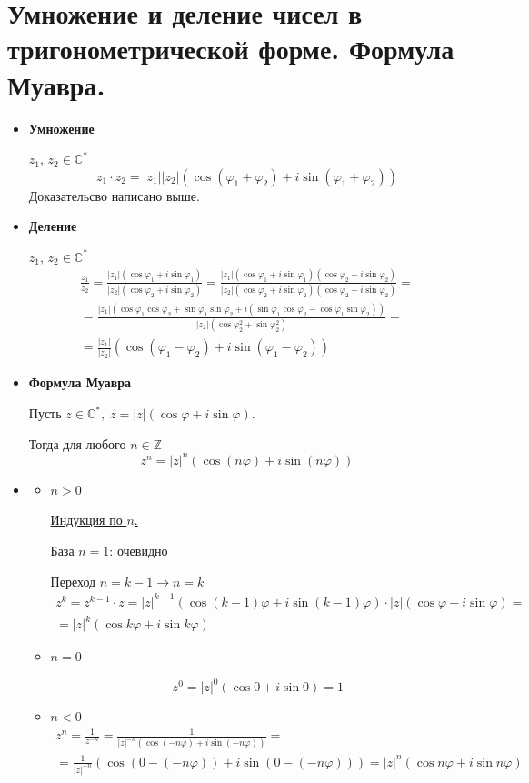 \documentclass[12pt,letterpaper]{report}
\makeatletter
\theoremstyle{definition}
\renewenvironment{proof}[1][\proofname]{%
   \par\pushQED{\qed}\normalfont%
   \topsep6\p@\@plus6\p@\relax
   \trivlist\item[\hskip\labelsep\bfseries#1\@addpunct{.}]%
   \ignorespaces
}{%
   \popQED\endtrivlist\@endpefalse
}
\makeatother
\begin{document}
\section{Умножение и деление чисел в тригонометрической форме. Формула Муавра.}
\begin{itemize}
  \item \textbf{Умножение} 
  
  $z_1,\, z_2 \in \mathbb{C}^*$
  \[ z_1 \cdot z_2 = |z_1||z_2|(\cos(\varphi_1 + \varphi_2) + i\sin(\varphi_1 + \varphi_2)) \]
  Доказательсво написано выше.
  \item \textbf{Деление} 

  $z_1,\, z_2 \in \mathbb{C}^*$
  \begin{gather*}
    \frac{z_1}{z_2} = \frac{|z_1|(\cos\varphi_1 + i\sin\varphi_1)}{|z_2|(\cos\varphi_2 + i\sin\varphi_2)} = \frac{|z_1|(\cos\varphi_1 + i\sin\varphi_1)(\cos\varphi_2 - i\sin\varphi_2)}{|z_2|(\cos\varphi_2 + i\sin\varphi_2)(\cos\varphi_2 - i\sin\varphi_2)} = \\
    = \frac{|z_1|(\cos\varphi_1\cos\varphi_2 + \sin\varphi_1\sin\varphi_2 + i(\sin\varphi_1\cos\varphi_2 - \cos\varphi_1\sin\varphi_2))}{|z_2|(\cos\varphi_2^2 + \sin\varphi_2^2)} = \\
    = \frac{|z_1|}{|z_2|}(\cos(\varphi_1 - \varphi_2) + i\sin(\varphi_1 - \varphi_2))
  \end{gather*}
  \item \textbf{Формула Муавра}
  
  Пусть $z \in \mathbb{C}^*,\; z = |z|(\cos\varphi + i\sin\varphi)$. 

  Тогда для любого $n \in \mathbb{Z}$
  \[ z^n = |z|^n(\cos(n\varphi) + i\sin(n\varphi)) \]
  \begin{proof} \quad
    \begin{itemize}
      \item $n > 0$
      
      \underline{Индукция по $n$.}

      База $n = 1$: очевидно

      Переход $n = k - 1 \to n = k$
      \begin{gather*}
        z^k = z^{k-1} \cdot z = |z|^{k-1}(\cos(k - 1)\varphi + i\sin(k - 1)\varphi) \cdot |z|(\cos\varphi + i\sin\varphi) =  \\
        = |z|^k(\cos k\varphi + i\sin k\varphi)    
      \end{gather*}
      \item $n = 0$
      
      \[ z^0 = |z|^0(\cos 0 + i\sin 0) = 1 \]
      \item $n < 0$
      \begin{gather*}
        z^n = \frac{1}{z^{-n}} = \frac{1}{|z|^{-n}(\cos(-n\varphi) + i\sin(-n\varphi))} = \\
        = \frac{1}{|z|^{-n}}(\cos(0 - (-n\varphi)) + i\sin(0 - (-n\varphi))) = |z|^n(\cos n\varphi + i\sin n\varphi)
      \end{gather*}
    \end{itemize}
  \end{proof}
  
\end{itemize}



\ifdefined\niveldos\else
\end{document}

